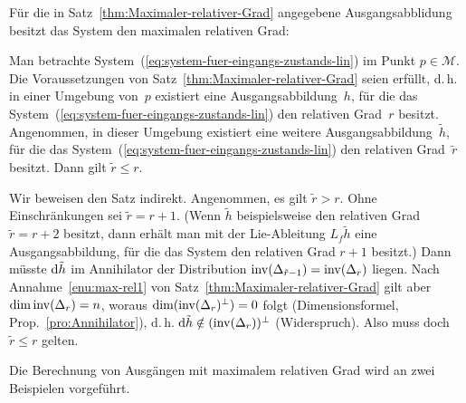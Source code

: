 Für die in Satz~\ref{thm:Maximaler-relativer-Grad} angegebene Ausgangsabblidung
besitzt das System den maximalen relativen
Grad:
\begin{theorem}
\label{thm:Maximalitaet-rel-grad}Man betrachte System~(\ref{eq:system-fuer-eingangs-zustands-lin})
im Punkt $p\in\mathcal{M}$. Die Voraussetzungen von Satz~\ref{thm:Maximaler-relativer-Grad}
seien erfüllt, d.\,h. in einer Umgebung von~$p$ existiert eine
Ausgangsabbildung~$h$, für die das System~(\ref{eq:system-fuer-eingangs-zustands-lin})
den relativen Grad~$r$ besitzt. Angenommen, in dieser Umgebung existiert
eine weitere Ausgangsabbildung~$\tilde{h}$, für die das System~(\ref{eq:system-fuer-eingangs-zustands-lin})
den relativen Grad~$\tilde{r}$ besitzt. Dann gilt $\tilde{r}\leq r$.
\end{theorem}
\begin{svmultproof2}
Wir beweisen den Satz indirekt. Angenommen, es gilt $\tilde{r}>r$.
Ohne Einschränkungen sei $\tilde{r}=r+1$. (Wenn $\tilde{h}$ beispielsweise
den relativen Grad $\tilde{r}=r+2$ besitzt, dann erhält man mit der
Lie-Ableitung $L_{f}\tilde{h}$ eine Ausgangsabbildung, für die das
System den relativen Grad $r+1$ besitzt.) Dann müsste ${\mathrm{d}}\tilde{h}$
im Annihilator der Distribution ${\operatorname{inv}}(\Delta_{\tilde{r}-1})={\operatorname{inv}}(\Delta_{r})$
liegen. Nach Annahme~\ref{enu:max-rel1} von Satz~\ref{thm:Maximaler-relativer-Grad}
gilt aber $\dim{\operatorname{inv}}(\Delta_{r})=n$, woraus $\dim({\operatorname{inv}}(\Delta_{r})^{\perp})=0$
folgt (Dimensionsformel, Prop.~\ref{pro:Annihilator}), d.\,h. ${\mathrm{d}}\tilde{h}\notin({\operatorname{inv}}(\Delta_{r}))^{\perp}$
(Widerspruch). Also muss doch $\tilde{r}\leq r$ gelten.
\end{svmultproof2}

Die Berechnung von Ausgängen mit maximalem relativen Grad wird an
zwei Beispielen vorgeführt.

